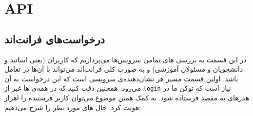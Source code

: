 \section{API}
\subsection{درخواست‌های فرانت‌اند}
در این قسمت به بررسی
های
تمامی سرویس‌ها می‌پردازیم که کاربران
(یعنی اساتید و دانشجویان و مسئولان آموزشی)
و به صورت کلی فرانت‌اند می‌تواند با آن‌ها در تعامل باشد. اولین قسمت مسیر هر
نشان‌دهنده‌ی سرویسی است که این درخواست به آن می‌رود. همچنین دقت کنید که در همه‌ی
ها
غیر از
\verb|login|
نیاز است که توکن ما در هدر‌های
به مقصد فرستاده شود. به کمک همین موضوع می‌توان کاربر فرستنده را اهراز هویت کرد. حال
های
مورد نظر را شرح می‌دهیم:

